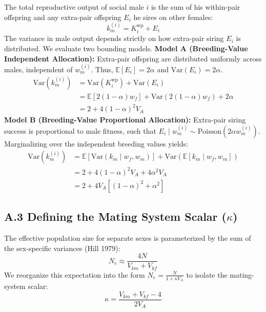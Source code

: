 \documentclass[11pt]{article}
\begin{document}
The total reproductive output of social male $i$ is the sum of his within-pair offspring and any extra-pair offspring $E_i$ he sires on other females:
\begin{equation}
    k_m^{(i)} = K_i^{\text{wp}} + E_i
\end{equation}
The variance in male output depends strictly on how extra-pair siring $E_i$ is distributed. We evaluate two bounding models.
\newline
\textbf{Model A (Breeding-Value Independent Allocation):} Extra-pair offspring are distributed uniformly across males, independent of $w_m^{(i)}$. Thus, $\mathbb{E}[E_i] = 2\alpha$ and $\text{Var}(E_i) = 2\alpha$.
\begin{align}
    \text{Var}(k_m^{(i)}) &= \text{Var}(K_i^{\text{wp}}) + \text{Var}(E_i) \nonumber \\
    &= \mathbb{E}[2(1-\alpha) w_f] + \text{Var}(2(1-\alpha) w_f) + 2\alpha \nonumber \\
    &= 2 + 4(1-\alpha)^2 V_A
\end{align}
\textbf{Model B (Breeding-Value Proportional Allocation):} Extra-pair siring success is proportional to male fitness, such that $E_i \mid w_m^{(i)} \sim \mathrm{Poisson}(2\alpha w_m^{(i)})$. Marginalizing over the independent breeding values yields:
\begin{align}
    \text{Var}(k_m^{(i)}) &= \mathbb{E}[\text{Var}(k_m \mid w_f, w_m)] + \text{Var}(\mathbb{E}[k_m \mid w_f, w_m]) \nonumber \\
    &= 2 + 4(1-\alpha)^2 V_A + 4\alpha^2 V_A \nonumber \\
    &= 2 + 4 V_A \left[(1-\alpha)^2 + \alpha^2\right]
\end{align}

\subsection*{A.3 Defining the Mating System Scalar ($\kappa$)}
The effective population size for separate sexes is parameterized by the sum of the sex-specific variances (Hill 1979):
\begin{equation}
    N_e \approx \frac{4N}{V_{km} + V_{kf}}
\end{equation}
We reorganize this expectation into the form $N_e = \frac{N}{1 + \kappa V_A}$ to isolate the mating-system scalar:
\begin{equation}
    \kappa = \frac{V_{km} + V_{kf} - 4}{2 V_A}
\end{equation}
\end{document}
